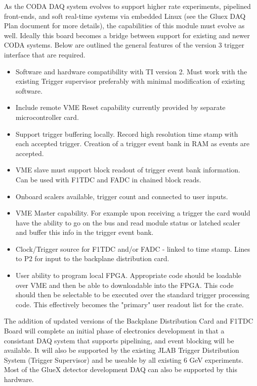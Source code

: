 \documentclass[10pt]{article}
\begin{document}
As the CODA DAQ system evolves to support higher rate experiments, pipelined 
front-ends, and soft real-time systems via embedded Linux (see the Gluex DAQ Plan document for
more details), the capabilities of this module must evolve as well. Ideally this board becomes a
bridge between support for existing and newer CODA systems. Below are outlined the general 
features of the version 3 trigger interface that are required. 
\begin{itemize}
\item Software and hardware compatibility with TI version 2. Must work with the 
existing Trigger supervisor preferably with minimal modification of existing 
software.
\item Include remote VME Reset capability currently provided by separate 
microcontroller card.
\item Support trigger buffering locally. Record high resolution time stamp with 
each accepted trigger. Creation of a trigger event bank in RAM as events are 
accepted.
\item VME slave must support block readout of trigger event bank information. 
Can be used with F1TDC and FADC in chained block reads.
\item Onboard scalers available, trigger count and connected to user inputs.
\item VME Master capability. For example upon receiving a trigger the card would 
have the ability to go on the bus and read module status or latched scaler 
and buffer this info in the trigger event bank.
\item Clock/Trigger source for F1TDC and/or FADC - linked to time stamp. Lines to 
P2 for input to the backplane distribution card. 
\item User ability to program local FPGA. Appropriate code should be loadable 
over VME and then be able to downloadable into the FPGA. This code should 
then be selectable to be executed over the standard trigger processing code. 
This effectively becomes the "primary" user readout list for the crate.
\end{itemize}

The addition of updated versions of the Backplane Distribution Card and F1TDC Board 
will complete an initial phase of electronics development in that a consistant DAQ
system that supports pipelining, and event blocking will be available. It will also
be supported by the existing JLAB Trigger Distribution System (Trigger Supervisor) and
be useable by all existing 6 GeV experiments. Most of the GlueX detector development DAQ
can also be supported by this hardware.
\end{document}
